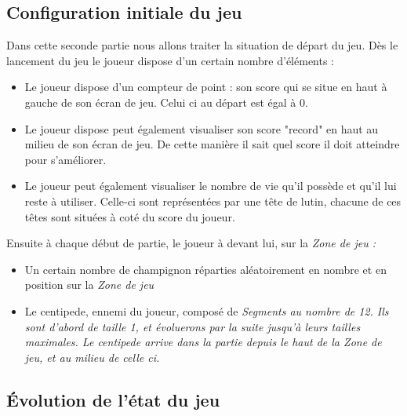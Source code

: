 \subsection{Configuration initiale du jeu}
Dans cette seconde partie nous allons traiter la situation de départ du jeu. Dès le lancement du jeu le joueur dispose d'un certain nombre d'éléments : 

\begin{itemize}
\item 
	Le joueur dispose d'un compteur de point : son score qui se situe en haut à gauche de son écran de jeu. Celui ci au départ est égal à 0.
	\item 
	Le joueur dispose peut également visualiser son score "record" en haut au milieu de son écran de jeu. De cette manière il sait quel score il doit atteindre pour s'améliorer.
	\item
	Le joueur peut également visualiser le nombre de vie qu'il possède et qu'il lui reste à utiliser. Celle-ci sont représentées par une tête de lutin, chacune de ces têtes sont situées à coté du score du joueur.
\end{itemize}


Ensuite à chaque début de partie, le joueur à devant lui, sur la  \itshape{Zone de jeu} : 

\begin{itemize}
	\item
	Un certain nombre de champignon réparties aléatoirement en nombre et en position sur la  \itshape{Zone de jeu}
	\item
	Le centipede, ennemi du joueur, composé de \itshape{Segments} au nombre de 12. Ils sont d'abord de taille 1, et évoluerons par la suite jusqu'à leurs tailles maximales. Le centipede arrive dans la partie depuis le haut de la \itshape{Zone de jeu}, et au milieu de celle ci. 
\end{itemize}
 



\subsection{Évolution de l'état du jeu}

